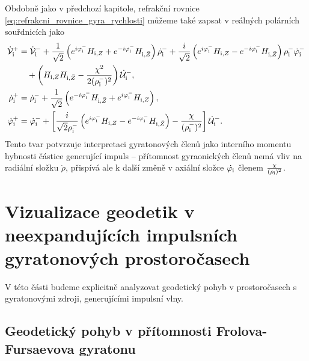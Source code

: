 Obdobně jako v předchozí kapitole, refrakční rovnice \eqref{eq:refrakcni_rovnice_gyra_rychlosti} můžeme také zapsat v reálných
polárních souřdnicích jako
\begin{equation}
    \begin{split}
    \dot{\mathcal{V}}_{\mathrm{i}}^{+} &= \dot{\mathcal{V}}_{\mathrm{i}}^{-} + \frac{1}{\sqrt{2}} \left(e^{i \varphi_{\mathrm{i}}^{-}} H_{\mathrm{i}, Z} + e^{-i \varphi_{\mathrm{i}}^{-}} H_{\mathrm{i}, \bar{Z}}\right) \dot{\rho}_{\mathrm{i}}^{-} +
    \frac{i}{\sqrt{2}} \left( e^{i \varphi_{\mathrm{i}}^{-}} H_{\mathrm{i}, Z} - e^{-i \varphi_{\mathrm{i}}^{-}} H_{\mathrm{i}, \bar{Z}} \right) \rho_{\mathrm{i}}^{-} \dot{\varphi}_{\mathrm{i}}^{-} \\
    &~~~+ \left(H_{\mathrm{i}, Z} H_{\mathrm{i}, \bar{Z}} - \frac{\chi^2}{2(\rho_{\mathrm{i}}^{-})^2}\right)\dot{\mathcal{U}}_{\mathrm{i}}^{-}, \\
    \dot{\rho}_{\mathrm{i}}^{+} &= \dot{\rho}_{\mathrm{i}}^{-} + \frac{1}{\sqrt{2}} \left(e^{-i \varphi_{\mathrm{i}}^{-}} H_{\mathrm{i}, \bar{Z}} + e^{i \varphi_{\mathrm{i}}^{-}} H_{\mathrm{i}, Z} \right), \\
    \dot{\varphi}_{\mathrm{i}}^{+} &= \dot{\varphi}_{\mathrm{i}}^{-} + \left[ \frac{i}{\sqrt{2} \rho_{\mathrm{i}}^{-}} \left(e^{i \varphi_{\mathrm{i}}^{-}} H_{\mathrm{i}, Z} - e^{-i \varphi_{\mathrm{i}}^{-}} H_{\mathrm{i}, \bar{Z}} \right) - \frac{\chi}{(\rho_{\mathrm{i}}^{-})^2}\right] \dot{\mathcal{U}}_{\mathrm{i}}^{-}.
    \end{split}
\end{equation}
Tento tvar potvrzuje interpretaci gyratonových členů jako interního momentu hybnosti částice generující impuls -- 
přítomnost gyraonických členů nemá vliv na radiální složku $\dot{\rho}$, přispívá ale k další změně v
axiální složce $\dot{\varphi_{\mathrm{i}}}$ členem $\frac{\chi}{(\rho_{\mathrm{i}})^2}$.

\section{Vizualizace geodetik v neexpandujících impulsních gyratonových prostoročasech}
V této části budeme explicitně analyzovat geodetický pohyb v prostoročasech s gyratonovými zdroji, generujícími impulsní vlny.
\subsection{Geodetický pohyb v přítomnosti Frolova-Fursaevova gyratonu}

